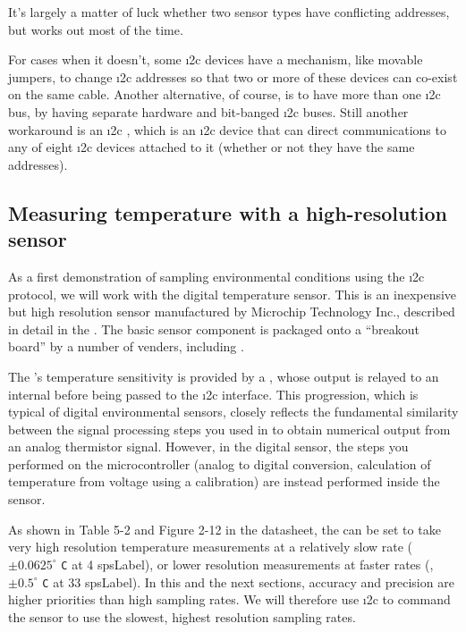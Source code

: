 It's largely a matter of luck whether two sensor types have conflicting addresses, but works out most of the time.

For cases when it doesn't, some \i2c devices have a mechanism, like movable jumpers, to change \i2c addresses so that two or more of these devices can co-exist on the same cable.
Another alternative, of course, is to have more than one \i2c bus, \eg by having separate hardware and bit-banged \i2c buses.
Still another workaround is an \i2c , which is an \i2c device that can direct communications to any of eight \i2c devices attached to it (whether or  not they have the same addresses).

\subsection{ Measuring temperature with a high-resolution sensor }
As a first demonstration of sampling environmental conditions using the \i2c protocol, we will work with the  digital temperature sensor.
This is an inexpensive but high resolution sensor manufactured by Microchip Technology Inc., described in detail in the .
The basic sensor component is packaged onto a ``breakout board'' by a number of venders, including .

The 's temperature sensitivity is provided by a , whose output is relayed to an internal \adc before being passed to the \i2c interface.
This progression, which is typical of digital environmental sensors, closely reflects the fundamental similarity between the signal processing steps you used in  to obtain numerical output from an analog thermistor signal.
However, in the digital sensor, the steps you performed on the microcontroller (analog to digital conversion, calculation of temperature from voltage using a calibration) are instead performed inside the sensor.

As shown in Table 5-2 and Figure 2-12 in the datasheet, the  can be set to take very high resolution temperature measurements at a relatively slow rate ($\pm 0.0625^\circ$ \texttt{C} at 4 \gls{spsLabel}), or lower resolution measurements at faster rates (\eg,$\pm 0.5 ^\circ$ \texttt{C} at 33 \gls{spsLabel}).
In this and the next sections, accuracy and precision are higher priorities than high sampling rates.
We will therefore use \i2c to command the sensor to use the slowest, highest resolution sampling rates.

